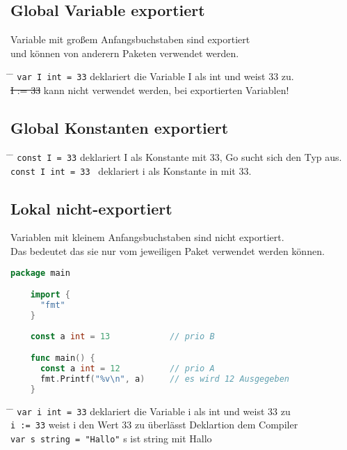 \documentclass[twoside,a4paper,12pt]{article}
\begin{document}
\subsection{Global Variable exportiert}
Variable mit großem Anfangsbuchstaben sind exportiert \\ 
und können von anderern Paketen verwendet werden. \\ 
\begin{tabbing}
 \hspace{2mm} \= \hspace{50mm} \= \kill
 \> \verb|var I int = 33| \>deklariert die Variable I als int und weist 33 zu. \\ 
 \> \sout{I := 33} \>kann nicht verwendet werden, bei exportierten Variablen!
\end{tabbing}

\subsection{Global Konstanten exportiert}
\begin{tabbing}
 \hspace{2mm} \= \hspace{50mm} \= \kill
 \> \verb|const I = 33| \> deklariert I als Konstante mit 33, Go sucht sich den Typ aus. \\ 
 \> \verb|const I int = 33 | \> deklariert i als Konstante in mit 33. \\
\end{tabbing}

\newpage
\subsection{Lokal nicht-exportiert}
Variablen mit kleinem Anfangsbuchstaben sind nicht exportiert. \\ 
Das bedeutet das sie nur vom jeweiligen Paket verwendet werden können.
\begin{center}
  \begin{minipage}{1.0\textwidth}
    \begin{lstlisting}[language=Go]
    package main 

    import {
      "fmt"
    }
    
    const a int = 13            // prio B

    func main() {
      const a int = 12          // prio A
      fmt.Printf("%v\n", a)     // es wird 12 Ausgegeben
    }

    \end{lstlisting}
  \end{minipage}
\end{center}
\begin{tabbing}
 \hspace{2mm} \= \hspace{50mm} \= \kill
 \> \verb|var i int = 33| \> deklariert die Variable i als int und weist 33 zu \\
 \> \verb|i := 33| \> weist i den Wert 33 zu überlässt Deklartion dem  Compiler \\
 \> \verb|var s string = "Hallo"| \> s ist string mit Hallo \\
\end{tabbing}
\end{document}
